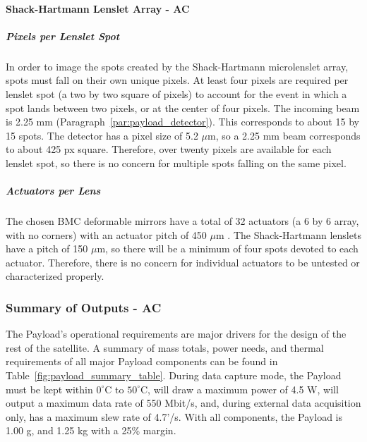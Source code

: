 \documentclass[12pt]{article}
\begin{document}
\paragraph{Shack-Hartmann Lenslet Array - AC}
			
\subparagraph{Pixels per Lenslet Spot}\label{sec:payload_pixels}
In order to image the spots created by the Shack-Hartmann microlenslet array, spots must fall on their own unique pixels.  At least four pixels are required per lenslet spot (a two by two square of pixels) to account for the event in which a spot lands between two pixels, or at the center of four pixels.
The incoming beam is 2.25 mm (Paragraph~\ref{par:payload_detector}).  This corresponds to about 15 by 15 spots. The detector has a pixel size of 5.2 $\mu$m, so a 2.25 mm beam corresponds to about 425 px square.  Therefore, over twenty pixels are available for each lenslet spot, so there is no concern for multiple spots falling on the same pixel. 
				
				\subparagraph{Actuators per Lens}
The chosen BMC deformable mirrors have a total of 32 actuators (a 6 by 6 array, with no corners) with an actuator pitch of 450 $\mu$m \cite{BMC}.  The Shack-Hartmann lenslets have a pitch of 150 $\mu$m, so there will be a minimum of four spots devoted to each actuator.  Therefore, there is no concern for individual actuators to be untested or characterized properly.

			\subsubsection{Summary of Outputs - AC}

The Payload's operational requirements are major drivers for the design of the rest of the satellite. A summary of mass totals, power needs, and thermal requirements of all major Payload components can be found in Table~\ref{fig:payload_summary_table}.  
During data capture mode, the Payload must be kept within $0^\circ$C to $50^\circ$C, will draw a maximum power of 4.5 W, will output a maximum data rate of 550 Mbit/s, and, during external data acquisition only, has a maximum slew rate of 4.7'/s. 
With all components, the Payload is 1.00 g, and 1.25 kg with a 25\% margin.  
\end{document}
